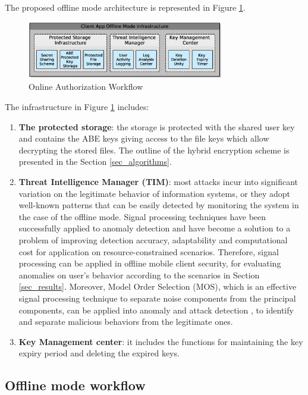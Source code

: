 \documentclass[twocolumn]{svjour3}          	%
\begin{document}
The proposed offline mode architecture is represented in Figure \ref{fig:5}.

\begin{figure}[h!]
	\centering
	\includegraphics[width=8.6cm]{figures/offlinesecurityarchitecture.eps}
	\caption{Online Authorization Workflow}
	\label{fig:5}
\end{figure}

The infrastructure in Figure \ref{fig:5} includes:

\begin{enumerate}
	\item \textbf{The protected storage}: the storage is protected with the shared user key and contains the ABE keys giving access to the file keys which allow decrypting the stored files. The outline of the hybrid encryption scheme is presented in the Section \ref{sec_algorithms}.
	\item \textbf{Threat Intelligence Manager (TIM)}: most attacks incur into significant variation on the legitimate behavior of information systems, or they adopt well-known patterns that can be easily detected by monitoring the system in the case of the offline mode. Signal processing techniques have been successfully applied to anomaly detection \cite{lu2009network, huang2009signal} and have become a solution to a problem of improving detection accuracy, adaptability and computational cost for application on resource-constrained scenarios. Therefore, signal processing can be applied in offline mobile client security, for evaluating anomalies on user's behavior according to the scenarios in Section \ref{sec_results}. Moreover, Model Order Selection (MOS), which is an effective signal processing technique to separate noise components from the principal components, can be applied into anomaly and attack detection \cite{tenorio2013greatest}, to identify and separate malicious behaviors from the legitimate ones.
	\item \textbf{Key Management center}: it includes the functions for maintaining the key expiry period and deleting the expired keys. 
\end{enumerate}

\subsection{Offline mode workflow}
\label{sec_offline_mode_workflow}
\end{document}
